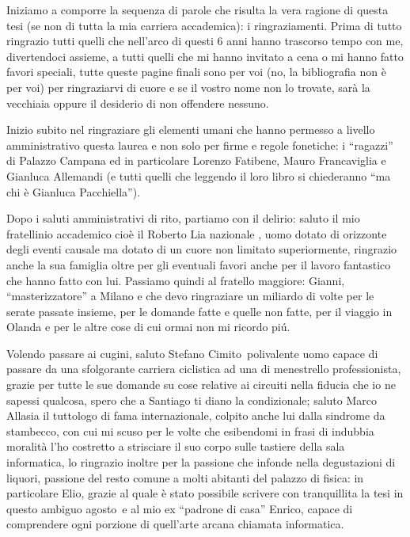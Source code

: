Iniziamo a comporre la sequenza di parole che risulta la vera ragione di questa tesi (se non di tutta la mia carriera accademica): i ringraziamenti. Prima di tutto ringrazio tutti quelli che nell'arco di questi $6$ anni hanno trascorso tempo con me, divertendoci assieme, a tutti quelli che mi hanno invitato a cena o mi hanno fatto favori speciali, tutte queste pagine finali sono per voi (no, la bibliografia non \`e per voi) per ringraziarvi di cuore e se il vostro nome non lo trovate, sar\`a la vecchiaia oppure il desiderio di non offendere nessuno.
\par
Inizio subito nel ringraziare gli elementi umani che hanno permesso a livello amministrativo questa laurea e non solo per firme e regole fonetiche: i ``ragazzi'' di Palazzo Campana ed in particolare Lorenzo Fatibene, Mauro Francaviglia e Gianluca Allemandi (e tutti quelli che leggendo il loro libro si chiederanno ``ma chi \`e Gianluca Pacchiella'').
\par
Dopo i saluti amministrativi di rito, partiamo con il delirio: saluto il mio fratellinio accademico cio\`e  il Roberto Lia nazionale , uomo dotato di orizzonte degli eventi causale ma dotato di un cuore non limitato superiormente, ringrazio anche la sua famiglia oltre per gli eventuali favori anche per il lavoro fantastico che hanno fatto con lui. Passiamo quindi al fratello maggiore: Gianni, ``masterizzatore'' a Milano e che devo ringraziare un miliardo di volte per le serate passate insieme, per le domande fatte  e quelle non fatte, per il viaggio in Olanda e per le altre cose di cui ormai non mi ricordo pi\'u.
\par
Volendo passare ai cugini, saluto Stefano Cimito\ polivalente uomo capace di passare da una sfolgorante carriera ciclistica ad una di menestrello professionista, grazie per tutte le sue domande su cose relative ai circuiti nella fiducia che io ne sapessi qualcosa, spero che a Santiago ti diano la condizionale; saluto Marco Allasia il tuttologo di fama internazionale, colpito anche lui dalla sindrome da stambecco, con cui mi scuso per le volte che esibendomi in frasi di indubbia moralit\`a l'ho costretto a strisciare il suo corpo sulle tastiere della sala informatica, lo ringrazio inoltre per la passione che infonde nella degustazioni di liquori, passione del resto comune a molti abitanti del palazzo di fisica: in particolare Elio, grazie al quale \`e stato possibile scrivere con tranquillita la tesi in questo ambiguo agosto\ e al mio ex ``padrone di casa'' Enrico, capace di comprendere ogni porzione di quell'arte arcana chiamata informatica.
